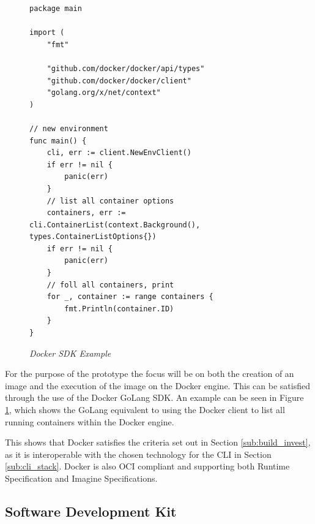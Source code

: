 \begin{figure}[!ht]
\begin{lstlisting}
package main

import (
	"fmt"

	"github.com/docker/docker/api/types"
	"github.com/docker/docker/client"
	"golang.org/x/net/context"
)

// new environment
func main() {
	cli, err := client.NewEnvClient()
	if err != nil {
		panic(err)
	}
    // list all container options
	containers, err := cli.ContainerList(context.Background(), types.ContainerListOptions{})
	if err != nil {
		panic(err)
	}
    // foll all containers, print
	for _, container := range containers {
		fmt.Println(container.ID)
	}
}
\end{lstlisting}
\caption{\em Docker SDK Example}
\label{fig:doc_example}
\end{figure}

For the purpose of the prototype the focus will be on both the creation of an image and the execution of the image on the \gls{Docker} engine. This can be satisfied through the use of the \gls{Docker} \gls{GoLang} \gls{SDK}. An example can be seen in Figure \ref{fig:doc_example}, which shows the \gls{GoLang} equivalent to using the \gls{Docker} client to list all running containers within the \gls{Docker} engine.

This shows that \gls{Docker} satisfies the criteria set out in Section \ref{sub:build_invest}, as it is interoperable with the chosen technology for the \gls{CLI} in Section \ref{sub:cli_stack}. Docker is also \gls{OCI} compliant and supporting both Runtime Specification and Imagine Specifications.


\subsection{Software Development Kit}
\label{sub:sdk_stack}
